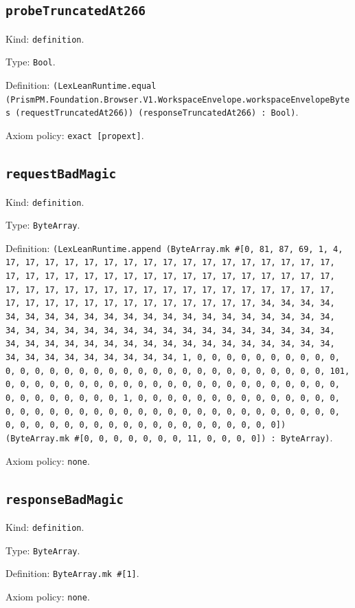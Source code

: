 \documentclass[11pt]{article}
\begin{document}
\subsection*{\texttt{probeTruncatedAt266}}
\noindent Kind: \texttt{definition}.\par
\noindent Type: \texttt{Bool}.\par
\noindent Definition: \texttt{(LexLeanRuntime.equal (PrismPM.Foundation.Browser.V1.WorkspaceEnvelope.workspaceEnvelopeBytes (requestTruncatedAt266)) (responseTruncatedAt266) : Bool)}.\par
\noindent Axiom policy: \texttt{exact [propext]}.\par
\subsection*{\texttt{requestBadMagic}}
\noindent Kind: \texttt{definition}.\par
\noindent Type: \texttt{ByteArray}.\par
\noindent Definition: \texttt{(LexLeanRuntime.append (ByteArray.mk \#[0, 81, 87, 69, 1, 4, 17, 17, 17, 17, 17, 17, 17, 17, 17, 17, 17, 17, 17, 17, 17, 17, 17, 17, 17, 17, 17, 17, 17, 17, 17, 17, 17, 17, 17, 17, 17, 17, 17, 17, 17, 17, 17, 17, 17, 17, 17, 17, 17, 17, 17, 17, 17, 17, 17, 17, 17, 17, 17, 17, 17, 17, 17, 17, 17, 17, 17, 17, 17, 17, 34, 34, 34, 34, 34, 34, 34, 34, 34, 34, 34, 34, 34, 34, 34, 34, 34, 34, 34, 34, 34, 34, 34, 34, 34, 34, 34, 34, 34, 34, 34, 34, 34, 34, 34, 34, 34, 34, 34, 34, 34, 34, 34, 34, 34, 34, 34, 34, 34, 34, 34, 34, 34, 34, 34, 34, 34, 34, 34, 34, 34, 34, 34, 34, 1, 0, 0, 0, 0, 0, 0, 0, 0, 0, 0, 0, 0, 0, 0, 0, 0, 0, 0, 0, 0, 0, 0, 0, 0, 0, 0, 0, 0, 0, 0, 0, 0, 101, 0, 0, 0, 0, 0, 0, 0, 0, 0, 0, 0, 0, 0, 0, 0, 0, 0, 0, 0, 0, 0, 0, 0, 0, 0, 0, 0, 0, 0, 0, 0, 1, 0, 0, 0, 0, 0, 0, 0, 0, 0, 0, 0, 0, 0, 0, 0, 0, 0, 0, 0, 0, 0, 0, 0, 0, 0, 0, 0, 0, 0, 0, 0, 0, 0, 0, 0, 0, 0, 0, 0, 0, 0, 0, 0, 0, 0, 0, 0, 0, 0, 0, 0, 0, 0, 0, 0, 0]) (ByteArray.mk \#[0, 0, 0, 0, 0, 0, 0, 11, 0, 0, 0, 0]) : ByteArray)}.\par
\noindent Axiom policy: \texttt{none}.\par
\subsection*{\texttt{responseBadMagic}}
\noindent Kind: \texttt{definition}.\par
\noindent Type: \texttt{ByteArray}.\par
\noindent Definition: \texttt{ByteArray.mk \#[1]}.\par
\noindent Axiom policy: \texttt{none}.\par
\end{document}
